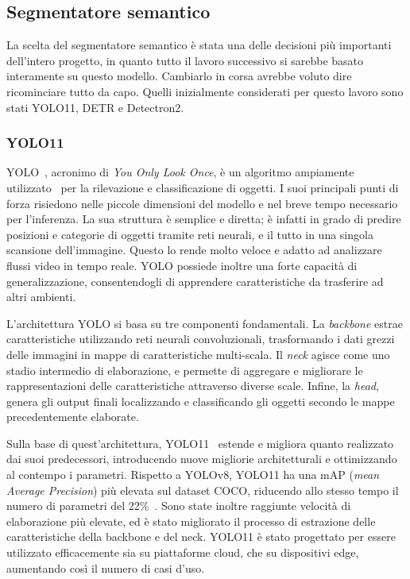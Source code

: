\documentclass[12pt]{report}
\begin{document}
\subsection{Segmentatore semantico}
\label{sec:segmentatore_semantico}

La scelta del segmentatore semantico è stata una delle decisioni più importanti dell'intero progetto, in quanto tutto il lavoro successivo si sarebbe basato interamente su questo modello. Cambiarlo in corsa avrebbe voluto dire ricominciare tutto da capo. Quelli inizialmente considerati per questo lavoro sono stati YOLO11, DETR e Detectron2.

\subsubsection{YOLO11}
\label{sec:yolo11}

YOLO~\cite{JIANG20221066}, acronimo di \textit{You Only Look Once}, è un algoritmo ampiamente utilizzato~\cite{sultana2020review} per la rilevazione e classificazione di oggetti. I suoi principali punti di forza risiedono nelle piccole dimensioni del modello e nel breve tempo necessario per l'inferenza. La sua struttura è semplice e diretta; è infatti in grado di predire posizioni e categorie di oggetti tramite reti neurali, e il tutto in una singola scansione dell'immagine. Questo lo rende molto veloce e adatto ad analizzare flussi video in tempo reale. YOLO possiede inoltre una forte capacità di generalizzazione, consentendogli di apprendere caratteristiche da trasferire ad altri ambienti.

L'architettura YOLO si basa su tre componenti fondamentali. La \textit{backbone} estrae caratteristiche utilizzando reti neurali convoluzionali, trasformando i dati grezzi delle immagini in mappe di caratteristiche multi-scala. Il \textit{neck} agisce come uno stadio intermedio di elaborazione, e permette di aggregare e migliorare le rappresentazioni delle caratteristiche attraverso diverse scale. Infine, la \textit{head}, genera gli output finali localizzando e classificando gli oggetti secondo le mappe precedentemente elaborate.

Sulla base di quest'architettura, YOLO11~\cite{yolo11_ultralytics} estende e migliora quanto realizzato dai suoi predecessori, introducendo nuove migliorie architetturali e ottimizzando al contempo i parametri. Rispetto a YOLOv8, YOLO11 ha una mAP (\textit{mean Average Precision}) più elevata sul dataset COCO, riducendo allo stesso tempo il numero di parametri del 22\%~\cite{khanam2024yolov11overviewkeyarchitectural}. Sono state inoltre raggiunte velocità di elaborazione più elevate, ed è stato migliorato il processo di estrazione delle caratteristiche della backbone e del neck. YOLO11 è stato progettato per essere utilizzato efficacemente sia su piattaforme cloud, che su dispositivi edge, aumentando così il numero di casi d'uso.
\end{document}
